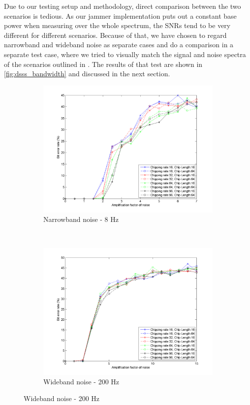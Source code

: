 	Due to our testing setup and methodology, direct comparison between the two scenarios is tedious. As our jammer implementation puts out a constant base power when measuring over the whole spectrum, the SNRs tend to be very different for different scenarios. Because of that, we have chosen to regard narrowband and wideband noise as separate cases and do a comparison in a separate test case, where we tried to visually match the signal and noise spectra of the scenarios outlined in \cite{ISS}. The results of that test are shown in \ref{fig:dsss_bandwidth} and discussed in the next section.
		\begin{figure}[H]
			\centering
		    \begin{subfigure}[b]{0.5\textwidth}
				\includegraphics[width=\textwidth]{imgs/results/plot_mode_dsss-test_narrowband-rep_20-dataRate_8-dataLength_128.png}
				\caption{Narrowband noise - 8 Hz}
				\label{fig:dsss_narrowband}
			\end{subfigure}%
			~
			\begin{subfigure}[b]{0.5\textwidth}
				\includegraphics[width=\textwidth]{imgs/results/plot_mode_dsss-test_wideband-rep_20-dataRate_8-dataLength_128.png}
				\caption{Wideband noise - 200 Hz}
				\label{fig:dsss_wideband}
			\end{subfigure}
		\end{figure}
		
